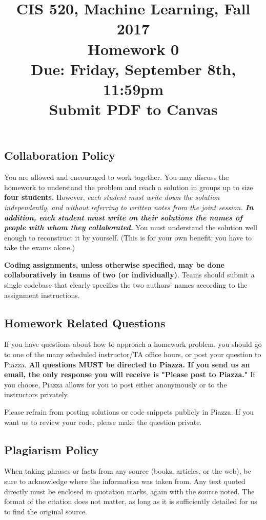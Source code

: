 \documentclass[english]{article}
\title{CIS 520, Machine Learning, Fall 2017 \\ Homework 0\\
Due: Friday, September 8th, 11:59pm \\ Submit PDF to Canvas}
\date{}
\begin{document}
\maketitle
\vspace{-30pt}
\subsection*{Collaboration Policy} 

You are allowed and encouraged to work together. You may discuss the
homework to understand the problem and reach a solution in groups up
to size {\bf four students.} However, {\em each student must write
  down the solution independently, and without referring to written
  notes from the joint session. {\bf In addition, each student must
    write on their solutions the names of people with whom they
    collaborated.}} You must understand the solution well enough 
to reconstruct it by yourself. (This is for your own benefit:
you have to take the exams alone.)

{\bf Coding assignments, unless otherwise specified, may be done
  collaboratively in teams of two (or individually)}. Teams should
submit a single codebase that clearly specifies the two
authors' names according to the assignment instructions.

\subsection*{Homework Related Questions}
If you have questions about how to approach a homework problem, you
should go to one of the many scheduled instructor/TA office hours, or post your question to Piazza. 
{\bf All questions MUST be directed to Piazza. If you send us an email, the only response you will receive is "Please post to Piazza." } If you choose, Piazza allows for you to post either anonymously or to the instructors privately.

Please refrain from posting solutions or code snippets publicly in Piazza. If you want us to review your code, please make the question private.

\subsection*{Plagiarism Policy}
When taking phrases or facts from any source (books,
articles, or the web), be sure to acknowledge where the information
was taken from.  Any text quoted directly must be enclosed in
quotation marks, again with the source noted.  The format of the
citation does not matter, as long as it is sufficiently detailed for
us to find the original source.
\end{document}
